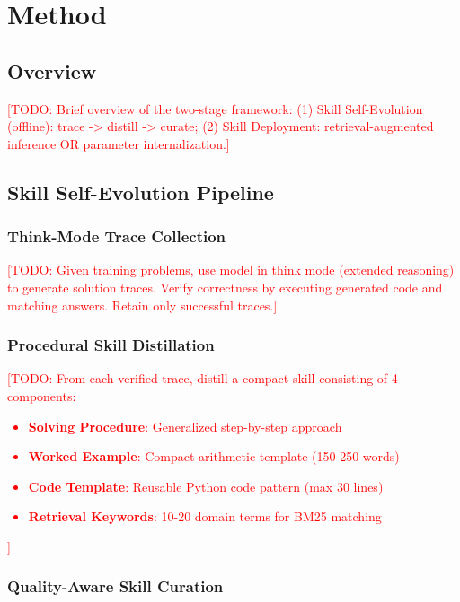 \documentclass[11pt]{article}
\newcommand{\todo}[1]{\textcolor{red}{[TODO: #1]}}
\begin{document}
\section{Method}
\label{sec:method}

\subsection{Overview}

\todo{Brief overview of the two-stage framework: (1) Skill Self-Evolution (offline): trace -> distill -> curate; (2) Skill Deployment: retrieval-augmented inference OR parameter internalization.}

\subsection{Skill Self-Evolution Pipeline}
\label{sec:skill_evolution}

\subsubsection{Think-Mode Trace Collection}
\todo{Given training problems, use model in think mode (extended reasoning) to generate solution traces. Verify correctness by executing generated code and matching answers. Retain only successful traces.}

\subsubsection{Procedural Skill Distillation}
\todo{From each verified trace, distill a compact skill consisting of 4 components:
\begin{itemize}
    \item \textbf{Solving Procedure}: Generalized step-by-step approach
    \item \textbf{Worked Example}: Compact arithmetic template (150-250 words)
    \item \textbf{Code Template}: Reusable Python code pattern (max 30 lines)
    \item \textbf{Retrieval Keywords}: 10-20 domain terms for BM25 matching
\end{itemize}
}

\subsubsection{Quality-Aware Skill Curation}
\label{sec:curation}
\end{document}
